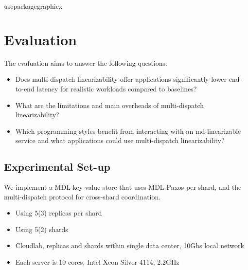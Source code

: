 usepackage{graphicx}
\section{Evaluation}
\label{sec:eval}

The evaluation aims to answer the following questions:

\begin{itemize}
\item Does multi-dispatch linearizability offer applications significantly lower end-to-end latency for realistic workloads compared to baselines?

\item What are the limitations and main overheads of multi-dispatch linearizability?

\item Which programming styles benefit from interacting with an md-linearizable service and what applications could use multi-dispatch linearizability?
\end{itemize}

\subsection{Experimental Set-up}
We implement a MDL key-value store that uses MDL-Paxos per shard, and the multi-dispatch protocol for cross-shard coordination.
\begin{itemize}
    \item Using 5(3) replicas per shard
    \item Using 5(2) shards
    \item Cloudlab, replicas and shards within single data center, 10Gbs local network
    \item Each server is 10 cores, Intel Xeon Silver 4114, 2.2GHz
\end{itemize}
